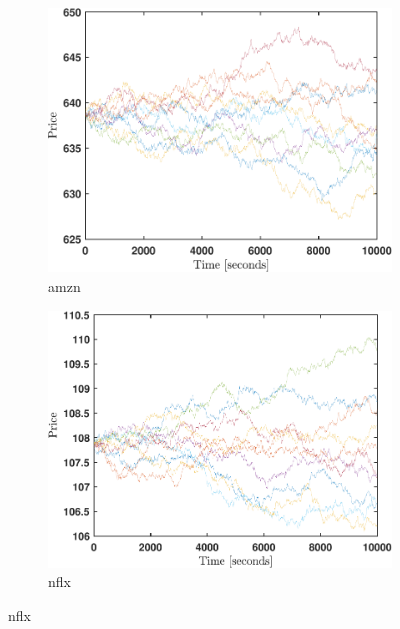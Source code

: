 \documentclass[11pt, a4paper]{thesis}  %
\begin{document}
\begin{figure}[H]	

	\centering	
	
	\begin{subfigure}[b]{0.5\textwidth}
    	\includegraphics[width=\textwidth]{./SignaturePlot/AMZN/20160104/simulated_paths.pdf}
		\caption{\ac{amzn}}
        \label{figure:result:price_evolution:amzn}        
	\end{subfigure}	
	
	\begin{subfigure}[b]{0.5\textwidth}
    	\includegraphics[width=\textwidth]{./SignaturePlot/NFLX/20160104/simulated_paths.pdf}
		\caption{\ac{nflx}}
        \label{figure:result:price_evolution:nflx}
	\end{subfigure}	
	

\end{figure}
\end{document}
